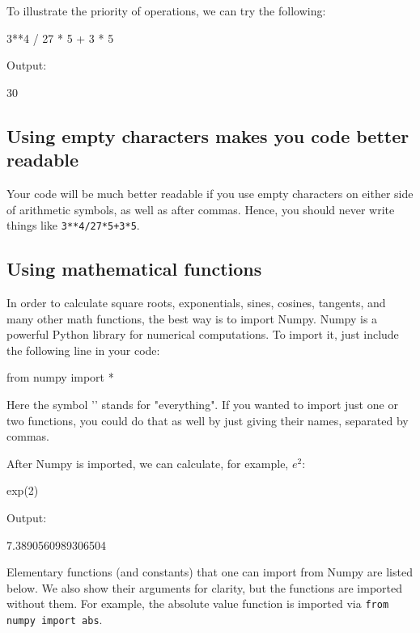 To illustrate the priority of operations, we can try the following:

\begin{bluecode}
3**4 / 27 * 5 + 3 * 5
\end{bluecode}
Output:

\begin{greencode}
30
\end{greencode}
\subsection{Using empty characters makes you code better readable}
Your code will be much better readable if you use empty
characters on either side of arithmetic symbols, as well as 
after commas. Hence, you should never write things like {\tt 3**4/27*5+3*5}.

\subsection{Using mathematical functions}

In order to calculate square roots, exponentials, sines, cosines, tangents, and many other 
math functions, the best way is to import Numpy. Numpy is a powerful Python library 
for numerical computations. To import it, just include the following 
line in your code:

\begin{bluecode}
from numpy import *
\end{bluecode}
Here the symbol '{\tt *}' stands for "everything". If you wanted to import just one or two 
functions, you could do that as well by just giving their names, separated by commas. 

After Numpy is imported, we can calculate, for example, $e^2$:

\begin{bluecode}
exp(2)
\end{bluecode}
Output:
\begin{greencode}
7.3890560989306504
\end{greencode}
Elementary functions (and constants) that one can import from Numpy are listed
below. We also show their arguments for clarity, but the functions are imported without 
them. For example, the absolute value function is imported via {\tt from numpy import abs}.\\

